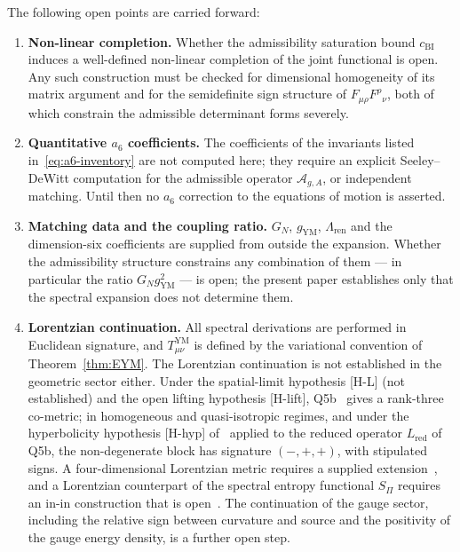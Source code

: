 \documentclass[12pt,a4paper]{article}
\theoremstyle{remark}
\begin{document}
      The following open points are carried forward:
      \begin{enumerate}
        \item \textbf{Non-linear completion.}
        Whether the admissibility saturation bound $c_{\mathrm{BI}}$~\cite{Beau2026c} induces a
        well-defined non-linear completion of the joint functional is open. Any such construction
        must be checked for dimensional homogeneity of its matrix argument and for the
        semidefinite sign structure of $F_{\mu\rho}F^{\rho}{}_{\nu}$, both of which constrain the
        admissible determinant forms severely.

        \item \textbf{Quantitative $a_6$ coefficients.}
        The coefficients of the invariants listed in~\eqref{eq:a6-inventory} are not computed
        here; they require an explicit Seeley--DeWitt computation for the admissible operator
        $\mathcal{A}_{g,A}$, or independent matching. Until then no $a_6$ correction to the
        equations of motion is asserted.

        \item \textbf{Matching data and the coupling ratio.}
        $G_N$, $g_{\mathrm{YM}}$, $\Lambda_{\mathrm{ren}}$ and the dimension-six coefficients are
        supplied from outside the expansion. Whether the admissibility structure constrains any
        combination of them --- in particular the ratio $G_N g_{\mathrm{YM}}^2$ --- is open; the
        present paper establishes only that the spectral expansion does not determine them.

        \item \textbf{Lorentzian continuation.}
        All spectral derivations are performed in Euclidean signature, and
        $T^{\mathrm{YM}}_{\mu\nu}$ is defined by the variational convention of
        Theorem~\ref{thm:EYM}.
        The Lorentzian continuation is not established in the geometric sector either.
        Under the spatial-limit hypothesis [H-L] (not established) and the open lifting hypothesis [H-lift],
        Q5b~\cite{Beau2026q5b} gives a rank-three co-metric; in homogeneous and quasi-isotropic regimes, and under
        the hyperbolicity hypothesis [H-hyp] of~\cite{Beau2026c} applied to the reduced operator
        $L_{\mathrm{red}}$ of Q5b, the non-degenerate block has signature $(-,+,+)$, with stipulated signs.
        A four-dimensional Lorentzian metric requires a supplied extension~\cite{Beau2026q6b}, and a Lorentzian
        counterpart of the spectral entropy functional $S_\Pi$ requires an in-in construction that is
        open~\cite{Beau2026i}.
        The continuation of the gauge sector, including the relative sign between curvature and source and the
        positivity of the gauge energy density, is a further open step.


\end{enumerate}
\end{document}
